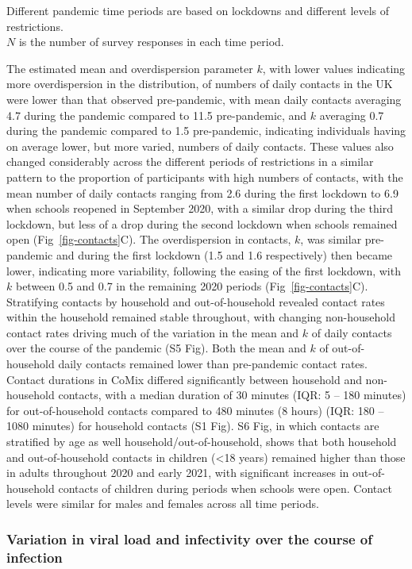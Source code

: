 \documentclass[
  10pt,
  letterpaper,
]{article}
\begin{document}
Different pandemic time periods are based on lockdowns and different
levels of restrictions.\\
\(N\) is the number of survey responses in each time period.

The estimated mean and overdispersion parameter \(k\), with lower values
indicating more overdispersion in the distribution, of numbers of daily
contacts in the UK were lower than that observed pre-pandemic, with mean
daily contacts averaging 4.7 during the pandemic compared to 11.5
pre-pandemic, and \(k\) averaging 0.7 during the pandemic compared to
1.5 pre-pandemic, indicating individuals having on average lower, but
more varied, numbers of daily contacts. These values also changed
considerably across the different periods of restrictions in a similar
pattern to the proportion of participants with high numbers of contacts,
with the mean number of daily contacts ranging from 2.6 during the first
lockdown to 6.9 when schools reopened in September 2020, with a similar
drop during the third lockdown, but less of a drop during the second
lockdown when schools remained open (Fig~\ref{fig-contacts}C). The
overdispersion in contacts, \(k\), was similar pre-pandemic and during
the first lockdown (1.5 and 1.6 respectively) then became lower,
indicating more variability, following the easing of the first lockdown,
with \(k\) between 0.5 and 0.7 in the remaining 2020 periods
(Fig~\ref{fig-contacts}C). Stratifying contacts by household and
out-of-household revealed contact rates within the household remained
stable throughout, with changing non-household contact rates driving
much of the variation in the mean and \(k\) of daily contacts over the
course of the pandemic (S5 Fig). Both the mean and \(k\) of
out-of-household daily contacts remained lower than pre-pandemic contact
rates. Contact durations in CoMix differed significantly between
household and non-household contacts, with a median duration of 30
minutes (IQR: 5 -- 180 minutes) for out-of-household contacts compared
to 480 minutes (8 hours) (IQR: 180 -- 1080 minutes) for household
contacts (S1 Fig). S6 Fig, in which contacts are stratified by age as
well household/out-of-household, shows that both household and
out-of-household contacts in children (\textless18 years) remained
higher than those in adults throughout 2020 and early 2021, with
significant increases in out-of-household contacts of children during
periods when schools were open. Contact levels were similar for males
and females across all time periods.

\subsubsection{Variation in viral load and infectivity over the course
of
infection}\label{variation-in-viral-load-and-infectivity-over-the-course-of-infection}
\end{document}

